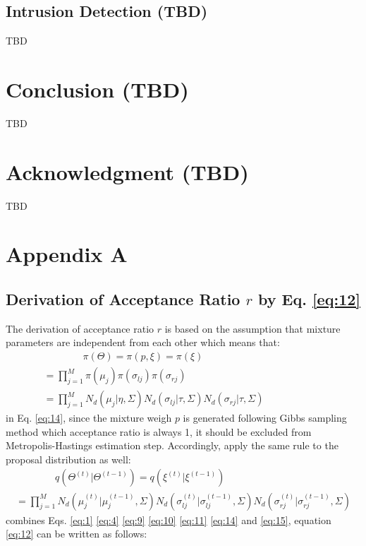 \documentclass[conference]{llncs}
\begin{document}
\subsection{Intrusion Detection (TBD)}
TBD

\section{Conclusion (TBD)}
TBD

\section*{Acknowledgment (TBD)}
TBD

\section*{Appendix A}
\subsection{Derivation of Acceptance Ratio $r$ by Eq. \eqref{eq:12}}
The derivation of acceptance ratio $r$ is based on the assumption that mixture parameters are independent from each other which means that:
\begin{multline}
\qquad\qquad\pi(\Theta) = \pi(p,\xi) = \pi(\xi) \\
= \prod_{j=1}^M\pi(\mu_j)\pi(\sigma_{lj})\pi(\sigma_{rj}) \qquad\qquad\qquad\qquad\qquad\\
= \prod_{j=1}^M\textit{N}_d(\mu_j|\eta,\Sigma)\textit{N}_d(\sigma_{lj}|\tau,\Sigma)\textit{N}_d(\sigma_{rj}|\tau,\Sigma)\qquad\qquad\qquad
\label{eq:13}
\end{multline}
in Eq. \eqref{eq:14}, since the mixture weigh $p$ is generated following Gibbs sampling method which acceptance ratio is always 1, it should be excluded from Metropolis-Hastings estimation step. Accordingly, apply the same rule to the proposal distribution as well:
\begin{multline}
\qquad\qquad q(\Theta^{(t)}|\Theta^{(t-1)}) = q(\xi^{(t)}|\xi^{(t-1)}) \\
= \prod_{j=1}^M\textit{N}_d(\mu_j^{(t)}|\mu_j^{(t-1)},\Sigma)\textit{N}_d(\sigma_{lj}^{(t)}|\sigma_{lj}^{(t-1)},\Sigma)\textit{N}_d(\sigma_{rj}^{(t)}|\sigma_{rj}^{(t-1)},\Sigma)
\label{eq:14}
\end{multline}
combines Eqs. \eqref{eq:1} \eqref{eq:4} \eqref{eq:9} \eqref{eq:10} \eqref{eq:11} \eqref{eq:14} and \eqref{eq:15}, equation \eqref{eq:12} can be written as follows:
\end{document}

